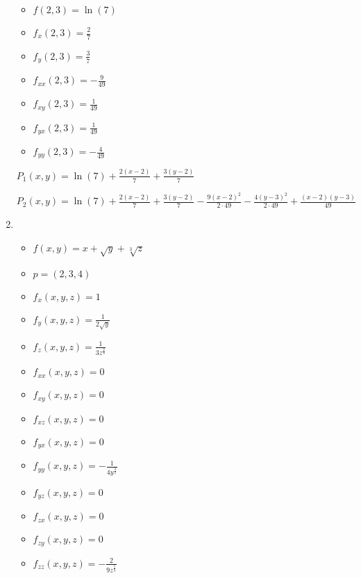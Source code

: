 \documentclass[../practica_05.tex]{subfiles}
\begin{document}
\begin{enumerate}
            \begin{itemize}
                \item $f(2,3) = \ln(7) $
                \item $f_{x}(2,3) = \frac{2}{7} $
                \item $f_{y}(2,3) = \frac{3}{7} $
                \item $f_{xx}(2,3) = -\frac{9}{49} $
                \item $f_{xy}(2,3) = \frac{1}{49} $
                \item $f_{yx}(2,3) = \frac{1}{49} $
                \item $f_{yy}(2,3) = -\frac{4}{49} $
            \end{itemize}

            $P_1(x,y) = \ln(7) + \frac{2(x-2)}{7} + \frac{3(y-2)}{7}$

            $P_2(x,y) = \ln(7) + \frac{2(x-2)}{7} + \frac{3(y-2)}{7} - \frac{9(x-2)^2}{2\cdot49} - \frac{4(y-3)^2}{2\cdot49} + \frac{(x-2)(y-3)}{49}$

        \item 
            \begin{itemize}
                \item $f(x,y) = x + \sqrt{y} + \sqrt[3]{z}$
                \item $p = (2,3,4)$
            \end{itemize}

            \begin{itemize}
                \item $f_{x}(x,y,z) = 1$
                \item $f_{y}(x,y,z) = \frac{1}{2\sqrt{y}} $
                \item $f_{z}(x,y,z) = \frac{1}{3z^{\frac{2}{3}}} $
                \item $f_{xx}(x,y,z) = 0 $
                \item $f_{xy}(x,y,z) = 0 $
                \item $f_{xz}(x,y,z) = 0 $
                \item $f_{yx}(x,y,z) = 0 $
                \item $f_{yy}(x,y,z) = -\frac{1}{4y^{\frac{3}{2}}} $
                \item $f_{yz}(x,y,z) = 0 $
                \item $f_{zx}(x,y,z) = 0 $
                \item $f_{zy}(x,y,z) = 0 $
                \item $f_{zz}(x,y,z) = -\frac{2}{9z^{\frac{5}{3}}} $
            \end{itemize}


\end{enumerate}
\end{document}
